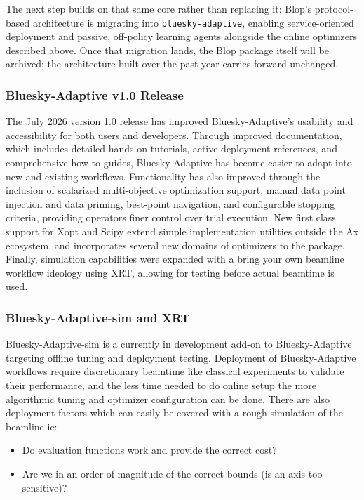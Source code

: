 The next step builds on that same core rather than replacing it: Blop's
protocol-based architecture is migrating into \texttt{bluesky-adaptive}, enabling
service-oriented deployment and passive, off-policy learning agents alongside the
online optimizers described above. Once that migration lands, the Blop package
itself will be archived; the architecture built over the past year carries forward
unchanged.

\subsubsection{Bluesky-Adaptive v1.0 Release}

The July 2026 version 1.0 release has improved Bluesky-Adaptive's usability and accessibility 
for both users and developers. Through improved documentation, which includes detailed 
hands-on tutorials, active deployment references, and comprehensive how-to guides, Bluesky-Adaptive 
has become easier to adapt into new and existing workflows.
Functionality has also improved through the inclusion of scalarized multi-objective optimization 
support, manual data point injection and data priming, best-point navigation, and configurable 
stopping criteria, providing operators finer control over trial execution.
New first class support for Xopt and Scipy extend simple implementation utilities outside the 
Ax ecosystem, and incorporates several new domains of optimizers to the package.
Finally, simulation capabilities were expanded with a bring your own beamline workflow ideology 
using XRT, allowing for testing before actual beamtime is used.

\subsubsection{Bluesky-Adaptive-sim and XRT}

Bluesky-Adaptive-sim is a currently in development add-on to Bluesky-Adaptive targeting offline tuning and deployment
testing. Deployment of Bluesky-Adaptive workflows require discretionary beamtime like classical 
experiments to validate their performance, and the less time needed to do online setup the 
more algorithmic tuning and optimizer configuration can be done. There are also deployment
factors which can easily be covered with a rough simulation of the beamline ie:  

\begin{itemize} 

\item Do evaluation functions work and provide the correct cost?  

\item Are we in an order of magnitude of the correct bounds (is an axis too sensitive)?  

\end{itemize} 


